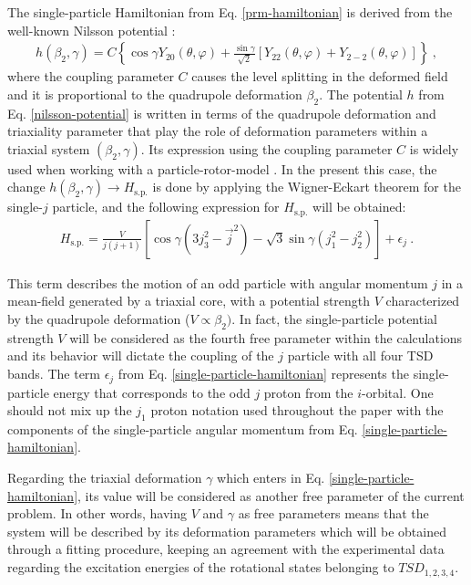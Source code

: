 \documentclass[myclassdoc,debug]{rjparticle}
\begin{document}
The single-particle Hamiltonian from Eq. \ref{prm-hamiltonian} is derived from the well-known Nilsson potential \cite{meyer1975collective,wang2008description}:
\begin{align}
    h(\beta_2,\gamma)=C\left\{\cos\gamma Y_{20}(\theta,\varphi)+\frac{\sin\gamma}{\sqrt{2}}\left[Y_{22}(\theta,\varphi)+Y_{2-2}(\theta,\varphi)\right]\right\}\ ,
    \label{nilsson-potential}
\end{align}
where the coupling parameter $C$ causes the level splitting in the deformed field and it is proportional to the quadrupole deformation $\beta_2$. The potential $h$ from Eq. \ref{nilsson-potential} is written in terms of the quadrupole deformation and triaxiality parameter that play the role of deformation parameters within a triaxial system $(\beta_2,\gamma)$. Its expression using the coupling parameter $C$ is widely used when working with a particle-rotor-model \cite{peng2003description,koike2004chiral,wang2007doublet}. In the present this case, the change $h(\beta_2,\gamma)\to H_\text{s.p.}$ is done by applying the Wigner-Eckart theorem for the single-$j$ particle, and the following expression for $H_\text{s.p.}$ will be obtained:
\begin{align}
    H_\text{s.p.}=\frac{V}{j(j+1)}\left[\cos\gamma(3j_3^2-\vec{j}^2)-\sqrt{3}\sin\gamma(j_1^2-j_2^2)\right]+\epsilon_j\ .
    \label{single-particle-hamiltonian}
\end{align}

This term describes the motion of an odd particle with angular momentum $j$ in a mean-field generated by a triaxial core, with a potential strength $V$ characterized by the quadrupole deformation ($V\propto\beta_2)$. In fact, the single-particle potential strength $V$ will be considered as the fourth free parameter within the calculations and its behavior will dictate the coupling of the $j$ particle with all four TSD bands. The term $\epsilon_j$ from Eq. \ref{single-particle-hamiltonian} represents the single-particle energy that corresponds to the odd $j$ proton from the $i$-orbital. One should not mix up the $j_1$ proton notation used throughout the paper with the components of the single-particle angular momentum from  Eq. \ref{single-particle-hamiltonian}.

Regarding the triaxial deformation $\gamma$ which enters in Eq. \ref{single-particle-hamiltonian}, its value will be considered as another free parameter of the current problem. In other words, having $V$ and $\gamma$ as free parameters means that the system will be described by its deformation parameters which will be obtained through a fitting procedure, keeping an agreement with the experimental data regarding the excitation energies of the rotational states belonging to $TSD_{1,2,3,4}$.
\end{document}
